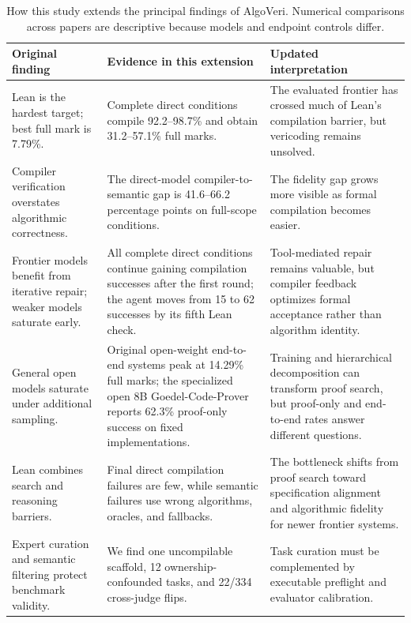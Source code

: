 \documentclass{article}
\begin{document}
\begin{table}[t]
\centering
\small
\caption{How this study extends the principal findings of AlgoVeri.  Numerical
comparisons across papers are descriptive because models and endpoint controls differ.}
\label{tab:extension-map}
\begin{tabularx}{\textwidth}{>{\raggedright\arraybackslash}p{}YY}
\toprule
Original finding & Evidence in this extension & Updated interpretation \\
\midrule
Lean is the hardest target; best full mark is 7.79\%. & Complete direct conditions
compile 92.2--98.7\% and obtain 31.2--57.1\% full marks. & The evaluated frontier has
crossed much of Lean's compilation barrier, but vericoding remains unsolved. \\
Compiler verification overstates algorithmic correctness. & The direct-model
compiler-to-semantic gap is 41.6--66.2 percentage points on full-scope conditions. &
The fidelity gap grows more visible as formal compilation becomes easier. \\
Frontier models benefit from iterative repair; weaker models saturate early. & All
complete direct conditions continue gaining compilation successes after the first
round; the agent moves from 15 to 62 successes by its fifth Lean check. & Tool-mediated
repair remains valuable, but compiler feedback optimizes formal acceptance rather than
algorithm identity. \\
General open models saturate under additional sampling. & Original open-weight
end-to-end systems peak at 14.29\% full marks; the specialized open 8B
Goedel-Code-Prover reports 62.3\% proof-only success on fixed implementations. &
Training and hierarchical decomposition can transform proof search, but proof-only and
end-to-end rates answer different questions. \\
Lean combines search and reasoning barriers. & Final direct compilation failures are
few, while semantic failures use wrong algorithms, oracles, and fallbacks. & The
bottleneck shifts from proof search toward specification alignment and algorithmic
fidelity for newer frontier systems. \\
Expert curation and semantic filtering protect benchmark validity. & We find one
uncompilable scaffold, 12 ownership-confounded tasks, and 22/334 cross-judge flips. &
Task curation must be complemented by executable preflight and evaluator calibration. \\
\bottomrule
\end{tabularx}
\end{table}
\end{document}

